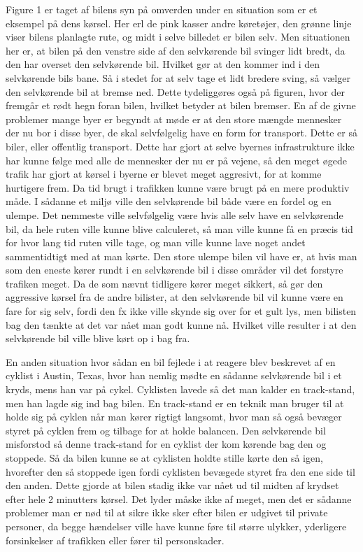 Figure 1 er taget af bilens syn på omverden under  en situation som er et eksempel på dens kørsel. Her erl de pink kasser andre køretøjer, den grønne linje viser bilens planlagte rute, og midt i selve billedet er bilen selv. Men situationen her er, at bilen på den venstre side af den selvkørende bil svinger lidt bredt, da den har overset den selvkørende bil. Hvilket gør at den kommer ind i den selvkørende bils bane. Så i stedet for at selv tage et lidt bredere sving, så vælger den selvkørende bil at bremse ned. Dette tydeliggøres også på figuren, hvor der fremgår et rødt hegn foran bilen, hvilket  betyder at bilen bremser. En af de givne problemer mange byer er begyndt at møde er at den store mængde mennesker der nu bor i disse byer, de skal selvfølgelig have en form for transport. Dette er så biler, eller offentlig transport. Dette har gjort at selve byernes infrastrukture ikke har kunne følge med alle de mennesker der nu er på vejene, så den meget øgede trafik har gjort at  kørsel i byerne er blevet meget aggresivt, for at komme hurtigere frem. Da tid brugt i trafikken kunne være brugt på en mere produktiv måde. I sådanne et miljø ville den selvkørende bil både være en fordel og en ulempe. Det nemmeste ville selvfølgelig være hvis alle selv have en selvkørende bil, da hele ruten ville kunne blive calculeret, så man ville kunne få en præcis tid for hvor lang tid ruten ville tage, og man ville kunne lave noget andet sammentidtigt med at man kørte. Den store ulempe bilen vil have er, at hvis man som den eneste kører rundt i en selvkørende bil i disse områder vil det forstyre trafiken meget. Da de som nævnt tidligere kører meget sikkert, så gør den aggressive kørsel fra de andre bilister, at den selvkørende bil vil kunne være en fare for sig selv, fordi den fx ikke ville skynde sig over for et gult lys, men bilisten bag den tænkte at det var nået man godt kunne nå. Hvilket ville resulter i at den selvkørende bil ville blive kørt op i bag fra. 

En anden situation hvor sådan en bil fejlede i at reagere blev beskrevet af en cyklist i Austin, Texas, hvor han nemlig mødte en sådanne selvkørende bil i et kryds, mens han var på cykel. Cyklisten lavede så det man kalder en track-stand, men han lagde sig ind bag bilen. En track-stand er en teknik man bruger til at holde sig på cyklen når man kører rigtigt langsomt, hvor man så også bevæger styret på cyklen frem og tilbage for at holde balancen. Den selvkørende bil misforstod så denne track-stand for en cyklist der kom kørende bag den og stoppede. Så da bilen kunne se at cyklisten holdte stille kørte den så igen, hvorefter den så stoppede igen fordi cyklisten bevægede styret fra den ene side til den anden. Dette gjorde at bilen stadig ikke var nået ud til midten af krydset efter hele 2 minutters kørsel\cite{VOX}. Det lyder måske ikke af meget, men det er sådanne problemer man er nød til at sikre ikke sker efter bilen er udgivet til private personer, da begge hændelser ville have kunne føre til større ulykker, yderligere forsinkelser af trafikken eller fører til personskader. 